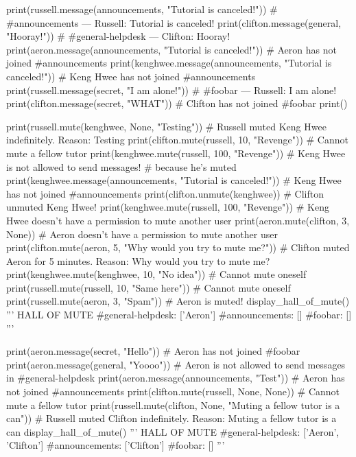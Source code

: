 \begin{python}
print(russell.message(announcements, "Tutorial is canceled!"))          # #announcements --- Russell: Tutorial is canceled!
print(clifton.message(general, "Hooray!"))                              # #general-helpdesk --- Clifton: Hooray!
print(aeron.message(announcements, "Tutorial is canceled!"))            # Aeron has not joined #announcements
print(kenghwee.message(announcements, "Tutorial is canceled!"))         # Keng Hwee has not joined #announcements
print(russell.message(secret, "I am alone!"))                           # #foobar --- Russell: I am alone!
print(clifton.message(secret, "WHAT"))                                  # Clifton has not joined #foobar
print()

print(russell.mute(kenghwee, None, "Testing"))                          # Russell muted Keng Hwee indefinitely. Reason: Testing
print(clifton.mute(russell, 10, "Revenge"))                             # Cannot mute a fellow tutor
print(kenghwee.mute(russell, 100, "Revenge"))                           # Keng Hwee is not allowed to send messages!
                                                                        # because he's muted
print(kenghwee.message(announcements, "Tutorial is canceled!"))         # Keng Hwee has not joined #announcements
print(clifton.unmute(kenghwee))                                         # Clifton unmuted Keng Hwee!
print(kenghwee.mute(russell, 100, "Revenge"))                           # Keng Hwee doesn't have a permission to mute another user
print(aeron.mute(clifton, 3, None))                                     # Aeron doesn't have a permission to mute another user
print(clifton.mute(aeron, 5, "Why would you try to mute me?"))          # Clifton muted Aeron for 5 minutes. Reason: Why would you try to mute me?
print(kenghwee.mute(kenghwee, 10, "No idea"))                           # Cannot mute oneself
print(russell.mute(russell, 10, "Same here"))                           # Cannot mute oneself
print(russell.mute(aeron, 3, "Spam"))                                   # Aeron is muted!
display_hall_of_mute()
'''
HALL OF MUTE
#general-helpdesk: ['Aeron']
#announcements: []
#foobar: []
'''

print(aeron.message(secret, "Hello"))                                   # Aeron has not joined #foobar
print(aeron.message(general, "Yoooo"))                                  # Aeron is not allowed to send messages in #general-helpdesk
print(aeron.message(announcements, "Test"))                             # Aeron has not joined #announcements
print(clifton.mute(russell, None, None))                                # Cannot mute a fellow tutor
print(russell.mute(clifton, None, "Muting a fellow tutor is a can"))    # Russell muted Clifton indefinitely. Reason: Muting a fellow tutor is a can
display_hall_of_mute()
'''
HALL OF MUTE
#general-helpdesk: ['Aeron', 'Clifton']
#announcements: ['Clifton']
#foobar: []
'''


\end{python}
